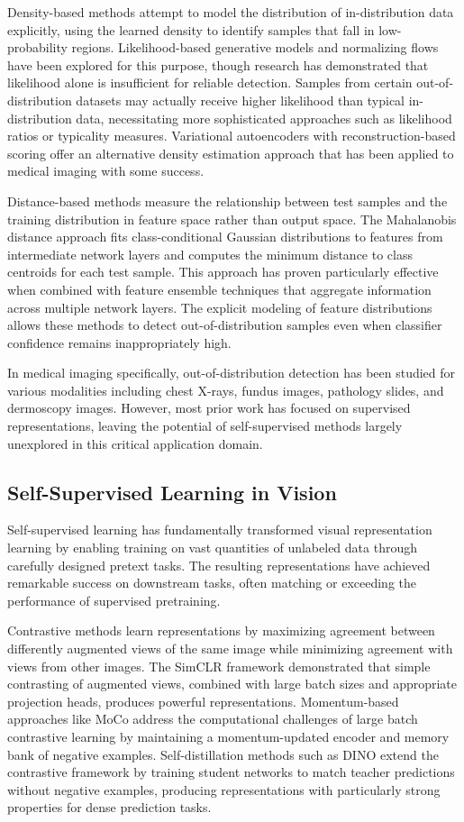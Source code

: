 \documentclass[11pt,a4paper]{article}
\begin{document}
Density-based methods attempt to model the distribution of in-distribution data explicitly, using the learned density to identify samples that fall in low-probability regions. Likelihood-based generative models and normalizing flows have been explored for this purpose, though research has demonstrated that likelihood alone is insufficient for reliable detection. Samples from certain out-of-distribution datasets may actually receive higher likelihood than typical in-distribution data, necessitating more sophisticated approaches such as likelihood ratios or typicality measures. Variational autoencoders with reconstruction-based scoring offer an alternative density estimation approach that has been applied to medical imaging with some success.

Distance-based methods measure the relationship between test samples and the training distribution in feature space rather than output space. The Mahalanobis distance approach fits class-conditional Gaussian distributions to features from intermediate network layers and computes the minimum distance to class centroids for each test sample. This approach has proven particularly effective when combined with feature ensemble techniques that aggregate information across multiple network layers. The explicit modeling of feature distributions allows these methods to detect out-of-distribution samples even when classifier confidence remains inappropriately high.

In medical imaging specifically, out-of-distribution detection has been studied for various modalities including chest X-rays, fundus images, pathology slides, and dermoscopy images. However, most prior work has focused on supervised representations, leaving the potential of self-supervised methods largely unexplored in this critical application domain.

\subsection{Self-Supervised Learning in Vision}

Self-supervised learning has fundamentally transformed visual representation learning by enabling training on vast quantities of unlabeled data through carefully designed pretext tasks. The resulting representations have achieved remarkable success on downstream tasks, often matching or exceeding the performance of supervised pretraining.

Contrastive methods learn representations by maximizing agreement between differently augmented views of the same image while minimizing agreement with views from other images. The SimCLR framework demonstrated that simple contrasting of augmented views, combined with large batch sizes and appropriate projection heads, produces powerful representations. Momentum-based approaches like MoCo address the computational challenges of large batch contrastive learning by maintaining a momentum-updated encoder and memory bank of negative examples. Self-distillation methods such as DINO extend the contrastive framework by training student networks to match teacher predictions without negative examples, producing representations with particularly strong properties for dense prediction tasks.
\end{document}
